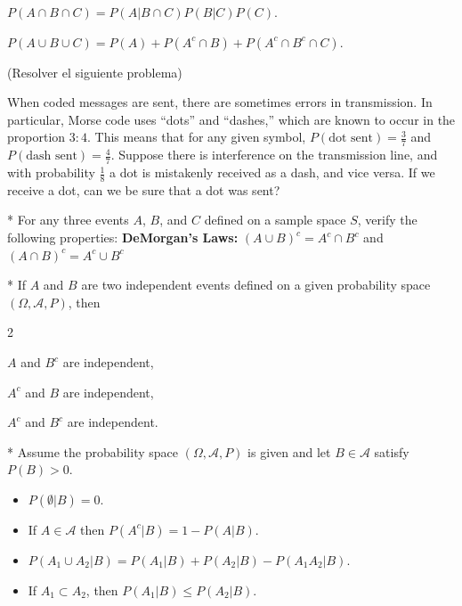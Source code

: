 \begin{Quest} $P(A \cap B \cap C)=P(A|B \cap C)P(B|C)P(C).$
\end{Quest}

\begin{Quest}
$P(A\cup B\cup C)=P(A)+P(A^c\cap B)+P(A^c\cap B^c\cap C).$

\end{Quest}


\begin{Quest}(Resolver el siguiente problema)

When coded messages are sent, there are sometimes errors in transmission. In particular, Morse code uses ``dots'' and ``dashes,'' which are known to occur in the proportion $3:4$. This means that for any given symbol, $P(\text{dot sent}) = \frac{3}{7}$ and $P(\text{dash sent}) = \frac{4}{7}.$ Suppose there is interference on the transmission line, and with probability $\frac18$ a dot is mistakenly received as a dash, and vice versa. If we receive a dot, can we be sure that a dot was sent?

\end{Quest}

\begin{Quest}* For any three events $A$, $B$, and $C$ defined on a sample space $S$, verify the following properties: \textbf{DeMorgan's Laws:} $(A \cup B)^c = A^c \cap B^c$ and $(A \cap B)^c = A^c \cup B^c$
\end{Quest}

\begin{Quest}* If $A$ and $B$ are two independent events defined on a given probability space $(\Omega,\mathcal{A},P)$, then

\begin{itemize}
\begin{multicols}{2}
\item[a) ] $A$ and $B^{c}$ are independent,

\item[b) ] $A^{c}$ and $B$ are independent,

\item[c) ] $A^{c}$ and $B^{c}$ are independent.
\end{multicols}
\end{itemize}

\end{Quest}

\begin{Quest}* Assume the probability space $(\Omega,\mathcal{A},P)$ is given and let $B\in\mathcal{A}$ satisfy $P(B)>0$.

\begin{itemize}
\item[a) ] $P(\emptyset|B)=0.$

\item[c) ] If $A\in\mathcal{A}$ then $P(A^c|B)=1-P(A|B).$

\item[e) ] $P(A_1\cup A_2|B)=P(A_1|B)+P(A_2|B)-P(A_1A_2|B).$

\item[f) ] If $A_1\subset A_2$, then $P(A_1|B)\le P(A_2|B).$
\end{itemize}
\end{Quest}

